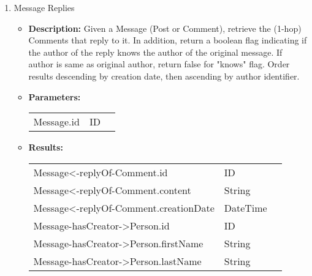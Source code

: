 \begin{enumerate}
  \item Message Replies
    \begin{itemize}
      \item \textbf{Description:}
        Given a Message (Post or Comment), retrieve the (1-hop) Comments that reply to it.
        In addition, return a boolean flag indicating if the author of the reply knows the author of the original message.
        If author is same as original author, return false for "knows" flag.
        Order results descending by creation date, then ascending by author identifier.
      \item \textbf{Parameters:} \\
        \begin{tabular}{lll}
          Message.id 										& ID \\
        \end{tabular}
      \item \textbf{Results:} \\
        \begin{tabular}{lll}
          Message<-replyOf-Comment.id                       & ID \\
          Message<-replyOf-Comment.content                       & String \\
          Message<-replyOf-Comment.creationDate                       & DateTime \\
          Message-hasCreator->Person.id     									& ID \\
          Message-hasCreator->Person.firstName    									& String \\
          Message-hasCreator->Person.lastName     									& String \\
        \end{tabular}
    \end{itemize}

\end{enumerate}

